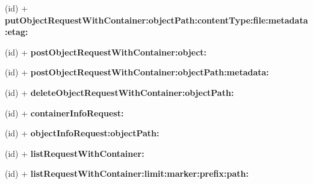 \begin{DoxyCompactItemize}
\item 
\hypertarget{interface_a_s_i_cloud_files_object_request_a4fd2c82bc1702341d5a482f7ff46db4b}{
(id) + {\bfseries put\-Object\-Request\-With\-Container\-:object\-Path\-:content\-Type\-:file\-:metadata\-:etag\-:}}
\label{interface_a_s_i_cloud_files_object_request_a4fd2c82bc1702341d5a482f7ff46db4b}

\item 
\hypertarget{interface_a_s_i_cloud_files_object_request_ae713a0e0f7867895b33210be74770c47}{
(id) + {\bfseries post\-Object\-Request\-With\-Container\-:object\-:}}
\label{interface_a_s_i_cloud_files_object_request_ae713a0e0f7867895b33210be74770c47}

\item 
\hypertarget{interface_a_s_i_cloud_files_object_request_a594d1d7c8fc812dc9acc2c862809b603}{
(id) + {\bfseries post\-Object\-Request\-With\-Container\-:object\-Path\-:metadata\-:}}
\label{interface_a_s_i_cloud_files_object_request_a594d1d7c8fc812dc9acc2c862809b603}

\item 
\hypertarget{interface_a_s_i_cloud_files_object_request_a55f1c9c4f71e7e3314b23d144b96fbac}{
(id) + {\bfseries delete\-Object\-Request\-With\-Container\-:object\-Path\-:}}
\label{interface_a_s_i_cloud_files_object_request_a55f1c9c4f71e7e3314b23d144b96fbac}

\item 
\hypertarget{interface_a_s_i_cloud_files_object_request_ab9af59ae6c15be52c702e45fca805db9}{
(id) + {\bfseries container\-Info\-Request\-:}}
\label{interface_a_s_i_cloud_files_object_request_ab9af59ae6c15be52c702e45fca805db9}

\item 
\hypertarget{interface_a_s_i_cloud_files_object_request_a4b4f0ea695cdec431818f4ca24a8a1cf}{
(id) + {\bfseries object\-Info\-Request\-:object\-Path\-:}}
\label{interface_a_s_i_cloud_files_object_request_a4b4f0ea695cdec431818f4ca24a8a1cf}

\item 
\hypertarget{interface_a_s_i_cloud_files_object_request_ad140f7f65fef97218ff5a8853afbc0c7}{
(id) + {\bfseries list\-Request\-With\-Container\-:}}
\label{interface_a_s_i_cloud_files_object_request_ad140f7f65fef97218ff5a8853afbc0c7}

\item 
\hypertarget{interface_a_s_i_cloud_files_object_request_a67e5f2848052dcdf80aac2ffd4f64525}{
(id) + {\bfseries list\-Request\-With\-Container\-:limit\-:marker\-:prefix\-:path\-:}}
\label{interface_a_s_i_cloud_files_object_request_a67e5f2848052dcdf80aac2ffd4f64525}


\end{DoxyCompactItemize}
